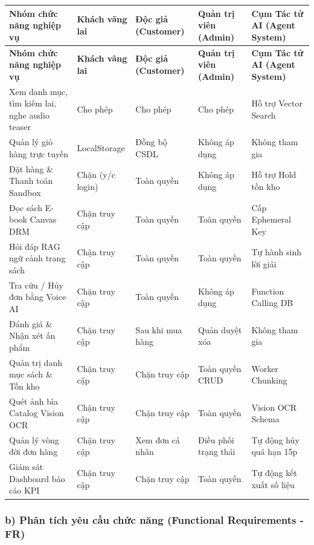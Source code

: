 \documentclass[11pt, a4paper]{report}
\begin{document}
\begin{longtable}{p{4.2cm} p{1.6cm} p{2.2cm} p{2.0cm} p{3.2cm}}
\toprule
\textbf{Nhóm chức năng nghiệp vụ} & \textbf{Khách vãng lai} & \textbf{Độc giả (Customer)} & \textbf{Quản trị viên (Admin)} & \textbf{Cụm Tác tử AI (Agent System)} \\
\midrule
\endfirsthead
\toprule
\textbf{Nhóm chức năng nghiệp vụ} & \textbf{Khách vãng lai} & \textbf{Độc giả (Customer)} & \textbf{Quản trị viên (Admin)} & \textbf{Cụm Tác tử AI (Agent System)} \\
\midrule
\endhead
\bottomrule
\endfoot
Xem danh mục, tìm kiếm lai, nghe audio teaser & Cho phép & Cho phép & Cho phép & Hỗ trợ Vector Search \\
\midrule
Quản lý giỏ hàng trực tuyến & LocalStorage & Đồng bộ CSDL & Không áp dụng & Không tham gia \\
\midrule
Đặt hàng \& Thanh toán Sandbox & Chặn (y/c login) & Toàn quyền & Không áp dụng & Hỗ trợ Hold tồn kho \\
\midrule
Đọc sách E-book Canvas DRM & Chặn truy cập & Toàn quyền & Toàn quyền & Cấp Ephemeral Key \\
\midrule
Hỏi đáp RAG ngữ cảnh trang sách & Chặn truy cập & Toàn quyền & Toàn quyền & Tự hành sinh lời giải \\
\midrule
Tra cứu / Hủy đơn bằng Voice AI & Chặn truy cập & Toàn quyền & Không áp dụng & Function Calling DB \\
\midrule
Đánh giá \& Nhận xét ấn phẩm & Chặn truy cập & Sau khi mua hàng & Quản duyệt xóa & Không tham gia \\
\midrule
Quản trị danh mục sách \& Tồn kho & Chặn truy cập & Chặn truy cập & Toàn quyền CRUD & Worker Chunking \\
\midrule
Quét ảnh bìa Catalog Vision OCR & Chặn truy cập & Chặn truy cập & Toàn quyền & Vision OCR Schema \\
\midrule
Quản lý vòng đời đơn hàng & Chặn truy cập & Xem đơn cá nhân & Điều phối trạng thái & Tự động hủy quá hạn 15p \\
\midrule
Giám sát Dashboard báo cáo KPI & Chặn truy cập & Chặn truy cập & Toàn quyền & Tự động kết xuất số liệu \\
\bottomrule
\end{longtable}

\subsubsection{b) Phân tích yêu cầu chức năng (Functional Requirements - FR)}
\end{document}
